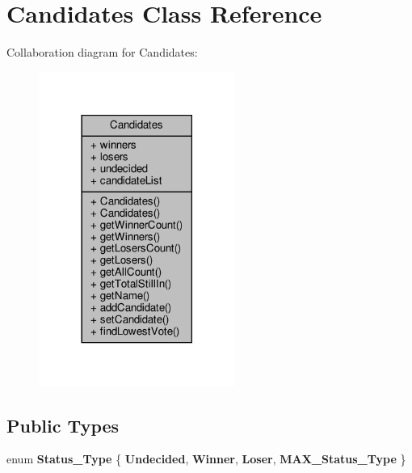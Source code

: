 \hypertarget{classCandidates}{}\section{Candidates Class Reference}
\label{classCandidates}


Collaboration diagram for Candidates\+:\nopagebreak
\begin{figure}[H]
\begin{center}
\leavevmode
\includegraphics[width=182pt]{classCandidates__coll__graph}
\end{center}
\end{figure}
\subsection*{Public Types}
\begin{DoxyCompactItemize}
\item 
\mbox{\label{classCandidates_affbd141eaea1fb26ce3e7162414c6594}} 
enum {\bfseries Status\+\_\+\+Type} \{ {\bfseries Undecided}, 
{\bfseries Winner}, 
{\bfseries Loser}, 
{\bfseries M\+A\+X\+\_\+\+Status\+\_\+\+Type}
 \}
\end{DoxyCompactItemize}
